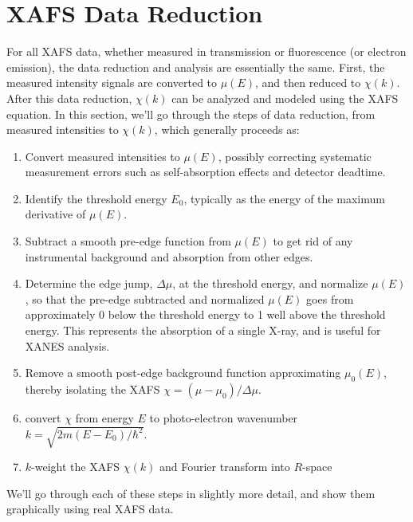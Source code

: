 \section{XAFS Data Reduction}

For all XAFS data, whether measured in transmission or fluorescence (or
electron emission), the data reduction and analysis are essentially the
same.  First, the measured intensity signals are converted to $\mu(E)$, and
then reduced to $\chi(k)$.  After this data reduction, $\chi(k)$ can be
analyzed and modeled using the XAFS equation.  In this section, we'll go
through the steps of data reduction, from measured intensities to
$\chi(k)$, which generally proceeds as:

\begin{enumerate}
\item Convert measured intensities to $\mu(E)$, possibly correcting
  systematic measurement errors such as self-absorption effects and detector
  deadtime.

\item Identify the threshold energy $E_0$, typically as the energy of the
  maximum derivative of $\mu(E)$.

\item Subtract a smooth pre-edge function from $\mu(E)$ to get rid of any
  instrumental background and absorption from other edges.

\item Determine the edge jump, $\Delta\mu$, at the threshold energy, and
  normalize $\mu(E)$, so that the pre-edge subtracted and normalized
  $\mu(E)$ goes from approximately 0 below the threshold energy to 1 well
  above the threshold energy.  This represents the absorption of a single
  X-ray, and is useful for XANES analysis.

\item Remove a smooth post-edge background function approximating
  $\mu_0(E)$, thereby isolating the XAFS $\chi = {(\mu-\mu_0)} /
  \Delta\mu$.

\item convert $\chi$ from energy $E$ to photo-electron wavenumber  $k =
  \sqrt{2m(E-E_0)/\hbar^2}$.

\item $k$-weight the XAFS $\chi(k)$ and Fourier transform into $R$-space
\end{enumerate}
\noindent
We'll go through each of these steps in slightly more detail, and show them
graphically using real XAFS data.

